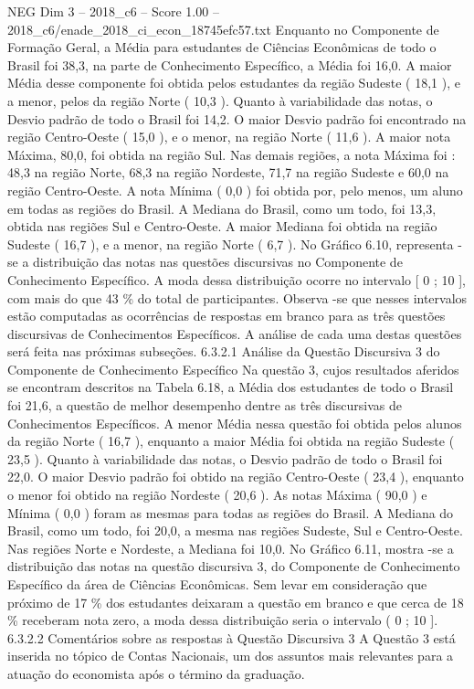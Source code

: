 \begin{textsample}{NEG Dim 3 – 2018\_c6 – Score 1.00 – 2018\_c6/enade\_2018\_ci\_econ\_18745efc57.txt}
Enquanto no Componente de Formação Geral, a Média para estudantes de Ciências Econômicas de todo o Brasil foi 38,3, na parte de Conhecimento Específico, a Média foi 16,0.
A maior Média desse componente foi obtida pelos estudantes da região Sudeste ( 18,1 ), e a menor, pelos da região Norte ( 10,3 ).
Quanto à variabilidade das notas, o Desvio padrão de todo o Brasil foi 14,2.
O maior Desvio padrão foi encontrado na região Centro-Oeste ( 15,0 ), e o menor, na região Norte ( 11,6 ).
A maior nota Máxima, 80,0, foi obtida na região Sul.
Nas demais regiões, a nota Máxima foi : 48,3 na região Norte, 68,3 na região Nordeste, 71,7 na região Sudeste e 60,0 na região Centro-Oeste.
A nota Mínima ( 0,0 ) foi obtida por, pelo menos, um aluno em todas as regiões do Brasil.
A Mediana do Brasil, como um todo, foi 13,3, obtida nas regiões Sul e Centro-Oeste.
A maior Mediana foi obtida na região Sudeste ( 16,7 ), e a menor, na região Norte ( 6,7 ).
No Gráfico 6.10, representa -se a distribuição das notas nas questões discursivas no Componente de Conhecimento Específico.
A moda dessa distribuição ocorre no intervalo [ 0 ; 10 ], com mais do que 43 \% do total de participantes.
Observa -se que nesses intervalos estão computadas as ocorrências de respostas em branco para as três questões discursivas de Conhecimentos Específicos.
A análise de cada uma destas questões será feita nas próximas subseções. 6.3.2.1 Análise da Questão Discursiva 3 do Componente de Conhecimento Específico Na questão 3, cujos resultados aferidos se encontram descritos na Tabela 6.18, a Média dos estudantes de todo o Brasil foi 21,6, a questão de melhor desempenho dentre as três discursivas de Conhecimentos Específicos.
A menor Média nessa questão foi obtida pelos alunos da região Norte ( 16,7 ), enquanto a maior Média foi obtida na região Sudeste ( 23,5 ).
Quanto à variabilidade das notas, o Desvio padrão de todo o Brasil foi 22,0.
O maior Desvio padrão foi obtido na região Centro-Oeste ( 23,4 ), enquanto o menor foi obtido na região Nordeste ( 20,6 ).
As notas Máxima ( 90,0 ) e Mínima ( 0,0 ) foram as mesmas para todas as regiões do Brasil.
A Mediana do Brasil, como um todo, foi 20,0, a mesma nas regiões Sudeste, Sul e Centro-Oeste.
Nas regiões Norte e Nordeste, a Mediana foi 10,0.
No Gráfico 6.11, mostra -se a distribuição das notas na questão discursiva 3, do Componente de Conhecimento Específico da área de Ciências Econômicas.
Sem levar em consideração que próximo de 17 \% dos estudantes deixaram a questão em branco e que cerca de 18 \% receberam nota zero, a moda dessa distribuição seria o intervalo ( 0 ; 10 ]. 6.3.2.2 Comentários sobre as respostas à Questão Discursiva 3 A Questão 3 está inserida no tópico de Contas Nacionais, um dos assuntos mais relevantes para a atuação do economista após o término da graduação.

\end{textsample}
